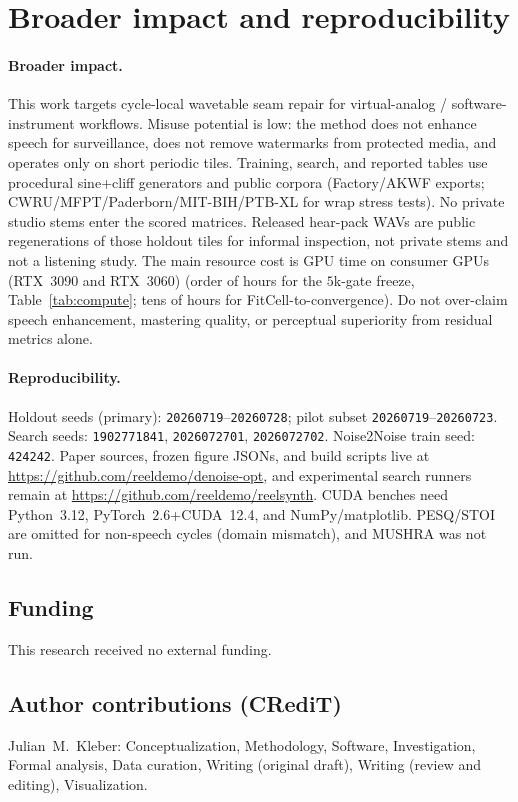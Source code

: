 \section{Broader impact and reproducibility}
\label{sec:ethics}

\paragraph{Broader impact.}
This work targets cycle-local wavetable seam repair for virtual-analog / software-instrument workflows.
Misuse potential is low: the method does not enhance speech for surveillance, does not remove watermarks from protected media, and operates only on short periodic tiles.
Training, search, and reported tables use procedural sine{+}cliff generators and public corpora (Factory/AKWF exports; CWRU/MFPT/Paderborn/MIT-BIH/PTB-XL for wrap stress tests).
No private studio stems enter the scored matrices.
Released hear-pack WAVs are public regenerations of those holdout tiles for informal inspection, not private stems and not a listening study.
The main resource cost is GPU time on consumer GPUs (RTX~3090 and RTX~3060) (order of hours for the $5$k-gate freeze, Table~\ref{tab:compute}; tens of hours for FitCell-to-convergence).
Do not over-claim speech enhancement, mastering quality, or perceptual superiority from residual metrics alone.

\paragraph{Reproducibility.}
Holdout seeds (primary): \texttt{20260719}--\texttt{20260728}; pilot subset \texttt{20260719}--\texttt{20260723}.
Search seeds: \texttt{1902771841}, \texttt{2026072701}, \texttt{2026072702}.
Noise2Noise train seed: \texttt{424242}.
Paper sources, frozen figure JSONs, and build scripts live at
\url{https://github.com/reeldemo/denoise-opt}, and
experimental search runners remain at \url{https://github.com/reeldemo/reelsynth}.
CUDA benches need Python~3.12, PyTorch~$2.6$+CUDA~12.4, and NumPy/matplotlib.
PESQ/STOI are omitted for non-speech cycles (domain mismatch), and MUSHRA was not run.

\subsection{Funding}
\label{sec:funding}
This research received no external funding.

\subsection{Author contributions (CRediT)}
\label{sec:credit}
Julian~M.~Kleber: Conceptualization, Methodology, Software, Investigation, Formal analysis, Data curation, Writing (original draft), Writing (review and editing), Visualization.

